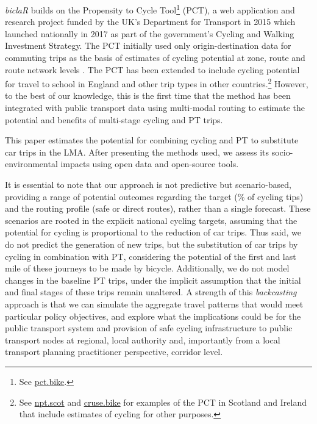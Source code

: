 \documentclass[review, doubleblind, 3p,
authoryear]{elsarticle} %
\begin{document}
\emph{biclaR} builds on the Propensity to Cycle Tool\footnote{See
  \href{https://www.pct.bike/}{pct.bike}.} (PCT), a web application and
research project funded by the UK's Department for Transport in 2015
which launched nationally in 2017 as part of the government's Cycling
and Walking Investment Strategy. The PCT initially used only
origin-destination data for commuting trips as the basis of estimates of
cycling potential at zone, route and route network levels
\citep{lovelace2017}. The PCT has been extended to include cycling
potential for travel to school in England \citep{goodman2019} and other
trip types in other countries.\footnote{See
  \href{https://www.npt.scot}{npt.scot} and
  \href{https://cruse.bike}{cruse.bike} for examples of the PCT in
  Scotland and Ireland that include estimates of cycling for other
  purposes.} However, to the best of our knowledge, this is the first
time that the method has been integrated with public transport data
using multi-modal routing to estimate the potential and benefits of
multi-stage cycling and PT trips.

This paper estimates the potential for combining cycling and PT to
substitute car trips in the LMA. After presenting the methods used, we
assess its socio-environmental impacts using open data and open-source
tools.

It is essential to note that our approach is not predictive but
scenario-based, providing a range of potential outcomes regarding the
target (\% of cycling tips) and the routing profile (safe or direct
routes), rather than a single forecast. These scenarios are rooted in
the explicit national cycling targets, assuming that the potential for
cycling is proportional to the reduction of car trips. Thus said, we do
not predict the generation of new trips, but the substitution of car
trips by cycling in combination with PT, considering the potential of
the first and last mile of these journeys to be made by bicycle.
Additionally, we do not model changes in the baseline PT trips, under
the implicit assumption that the initial and final stages of these trips
remain unaltered. A strength of this \emph{backcasting} approach is that
we can simulate the aggregate travel patterns that would meet particular
policy objectives, and explore what the implications could be for the
public transport system and provision of safe cycling infrastructure to
public transport nodes at regional, local authority and, importantly
from a local transport planning practitioner perspective, corridor
level.
\end{document}
